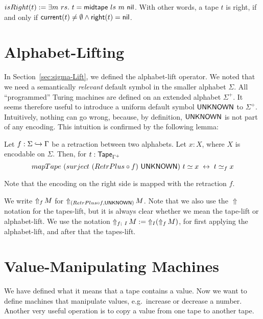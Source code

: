 \begin{definition}
  \label{def:isRght}
  $isRight(t) := \exists m~rs.~t=\MS{midtape}~ls~m~\nil$.
  With other words, a tape $t$ is right, if and only if $\MS{current}(t) \neq \None \land \MS{right}(t) = \nil$.
\end{definition}

\section{Alphabet-Lifting}
\label{sec:LiftAlphabet-UNKNOWN}

In Section~\ref{sec:sigma-Lift}, we defined the alphabet-lift operator.  We noted that we need a semantically \textit{relevant} default symbol in the
smaller alphabet $\Sigma$.  All ``programmed'' Turing machines are defined on an extended alphabet $\Sigma^+$.  It seems therefore useful to introduce
a uniform default symbol $\MS{UNKNOWN}$ to $\Sigma^+$.  Intuitively, nothing can go wrong, because, by definition, $\MS{UNKNOWN}$ is not part of any
encoding.  This intuition is confirmed by the following lemma: %
\begin{lemma}
  \label{lem:contains_translate_tau}
  Let $f: \Sigma \hookrightarrow \Tau$ be a retraction between two alphabets.  Let $x:X$, where $X$ is encodable on $\Sigma$. Then, for
  $t:\Tape_{\Tau^+}$
  \[
    mapTape~(surject~(RetrPlus \circ f)~\MS{UNKNOWN})~t \simeq x ~\iff~ t \simeq_f x
  \]
\end{lemma}
Note that the encoding on the right side is mapped with the retraction $f$.

We write $\LiftAlphabet{M}{f}$ for $\LiftAlphabet{M}{(RetrPlus \circ f , \MS{UNKNOWN})}$.  Note that we also use the $\Uparrow$ notation for the
tapes-lift, but it is always clear whether we mean the tape-lift or alphabet-lift.  We use the notation
$\LiftBoth{M}{f}{I} := \LiftTapes{(\LiftAlphabet{M}{f})}{I}$, for first applying the alphabet-lift, and after that the tapes-lift.

\section{Value-Manipulating Machines}
\label{sec:value-manipulate}

We have defined what it means that a tape contains a value.  Now we want to define machines that manipulate values, e.g.\ increase or decrease a
number.  Another very useful operation is to copy a value from one tape to another tape.

